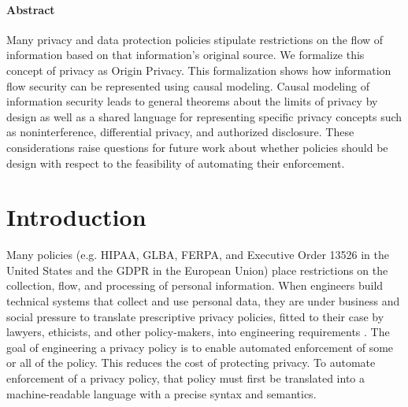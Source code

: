 \documentclass[../thesis.tex]{subfiles}
\begin{document}
 
 
\paragraph{Abstract}
Many privacy and data protection policies stipulate
restrictions on the flow of information based on that
information's original source.
We formalize this concept of privacy as Origin Privacy.
This formalization shows how information flow security
can be represented using causal modeling.
Causal modeling of information security leads to
general theorems about the limits of privacy by design
as well as a shared language for representing specific
privacy concepts such as noninterference, differential
privacy, and authorized disclosure.
These considerations raise questions for future work
about whether policies should be design with respect
to the feasibility of automating their enforcement.


\section{Introduction}
\label{sec:orgheadline2}


Many policies (e.g. HIPAA, GLBA, FERPA, and
Executive Order 13526 in the United States and the GDPR
in the European Union) place restrictions on the collection,
flow, and processing of personal information. When engineers
build technical systems that collect and use personal data,
they are under business and social pressure to translate
prescriptive privacy policies, fitted to their case by
lawyers, ethicists, and other policy-makers, into engineering
requirements \cite{barth07csf,fisler2010embracing,swire14iapp,sen14sp}.
The goal of engineering a privacy policy is to enable automated 
enforcement of some or all of the policy.
This reduces the cost of protecting privacy.
To automate enforcement of a privacy policy, that policy must 
first be translated into a machine-readable language with a 
precise syntax and semantics.
\end{document}
